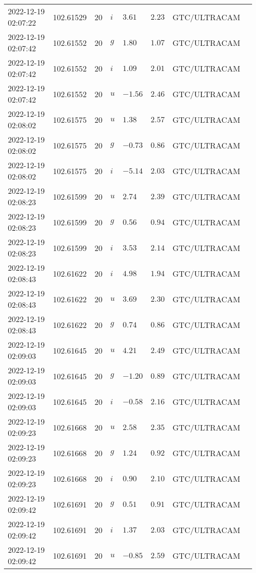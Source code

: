 \documentclass{nature_plusfigure}
\begin{document}
\begin{supplement}
\begin{center}
\begin{longtable}{llllllll}
2022-12-19 02:07:22 & 102.61529 & 20 & $i$ & $3.61$ & $2.23$ & GTC/ULTRACAM &  \\ 
2022-12-19 02:07:42 & 102.61552 & 20 & $g$ & $1.80$ & $1.07$ & GTC/ULTRACAM &  \\ 
2022-12-19 02:07:42 & 102.61552 & 20 & $i$ & $1.09$ & $2.01$ & GTC/ULTRACAM &  \\ 
2022-12-19 02:07:42 & 102.61552 & 20 & $u$ & $-1.56$ & $2.46$ & GTC/ULTRACAM &  \\ 
2022-12-19 02:08:02 & 102.61575 & 20 & $u$ & $1.38$ & $2.57$ & GTC/ULTRACAM &  \\ 
2022-12-19 02:08:02 & 102.61575 & 20 & $g$ & $-0.73$ & $0.86$ & GTC/ULTRACAM &  \\ 
2022-12-19 02:08:02 & 102.61575 & 20 & $i$ & $-5.14$ & $2.03$ & GTC/ULTRACAM &  \\ 
2022-12-19 02:08:23 & 102.61599 & 20 & $u$ & $2.74$ & $2.39$ & GTC/ULTRACAM &  \\ 
2022-12-19 02:08:23 & 102.61599 & 20 & $g$ & $0.56$ & $0.94$ & GTC/ULTRACAM &  \\ 
2022-12-19 02:08:23 & 102.61599 & 20 & $i$ & $3.53$ & $2.14$ & GTC/ULTRACAM &  \\ 
2022-12-19 02:08:43 & 102.61622 & 20 & $i$ & $4.98$ & $1.94$ & GTC/ULTRACAM &  \\ 
2022-12-19 02:08:43 & 102.61622 & 20 & $u$ & $3.69$ & $2.30$ & GTC/ULTRACAM &  \\ 
2022-12-19 02:08:43 & 102.61622 & 20 & $g$ & $0.74$ & $0.86$ & GTC/ULTRACAM &  \\ 
2022-12-19 02:09:03 & 102.61645 & 20 & $u$ & $4.21$ & $2.49$ & GTC/ULTRACAM &  \\ 
2022-12-19 02:09:03 & 102.61645 & 20 & $g$ & $-1.20$ & $0.89$ & GTC/ULTRACAM &  \\ 
2022-12-19 02:09:03 & 102.61645 & 20 & $i$ & $-0.58$ & $2.16$ & GTC/ULTRACAM &  \\ 
2022-12-19 02:09:23 & 102.61668 & 20 & $u$ & $2.58$ & $2.35$ & GTC/ULTRACAM &  \\ 
2022-12-19 02:09:23 & 102.61668 & 20 & $g$ & $1.24$ & $0.92$ & GTC/ULTRACAM &  \\ 
2022-12-19 02:09:23 & 102.61668 & 20 & $i$ & $0.90$ & $2.10$ & GTC/ULTRACAM &  \\ 
2022-12-19 02:09:42 & 102.61691 & 20 & $g$ & $0.51$ & $0.91$ & GTC/ULTRACAM &  \\ 
2022-12-19 02:09:42 & 102.61691 & 20 & $i$ & $1.37$ & $2.03$ & GTC/ULTRACAM &  \\ 
2022-12-19 02:09:42 & 102.61691 & 20 & $u$ & $-0.85$ & $2.59$ & GTC/ULTRACAM &  \\ 

\end{longtable}
\end{center}
\end{supplement}
\end{document}
